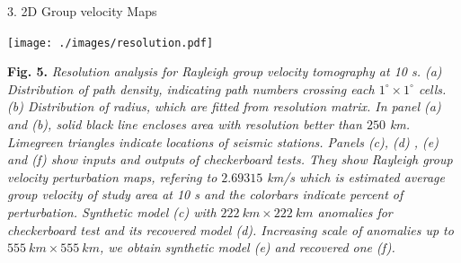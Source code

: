 \documentclass[
    landscape,      %
    paperwidth = 1120mm,
    paperheight = 820mm,
    fontscale = 0.45,
    margin = 1.7cm,
]{baposter}
\begin{document}
\begin{poster}
\begin{posterbox}[column=1]{3. 2D Group velocity Maps}
\begin{center}
\texttt{[image: ./images/resolution.pdf]}
\begin{minipage}{0.9\textwidth}
\footnotesize
\vspace{0.2em}
\textbf{Fig. 5.}
\itshape
Resolution analysis for Rayleigh group velocity tomography at 10 s. (a) Distribution
of path density, indicating path numbers crossing each $1^{\circ} \times 1^{\circ}$ cells.
(b) Distribution of radius, which are fitted from resolution matrix.  In panel (a) and (b),
solid black line encloses area with resolution better than $250$ km.  Limegreen triangles
indicate locations of seismic stations. Panels (c), (d) , (e) and (f) show inputs and outputs of checkerboard tests.
They show Rayleigh group velocity perturbation maps, refering to $2.69315$ km/s which is estimated average group velocity
of study area at 10 s and the colorbars indicate percent of perturbation.
Synthetic model (c) with $222 \ \textit{km} \times 222 \ \textit{km}$ anomalies for checkerboard test and its recovered model (d).
Increasing scale of anomalies up to $555 \ \textit{km} \times 555 \ \textit{km}$, we obtain synthetic model (e) and
recovered one (f).
\end{minipage}
\end{center}


\end{posterbox}
\end{poster}
\end{document}
